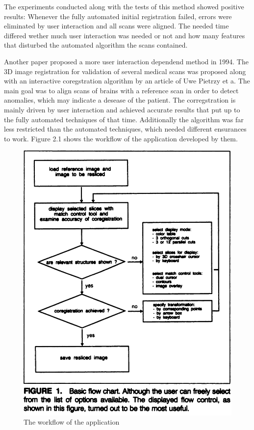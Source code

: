 \documentclass[hyperref,english,bachelorofscience,bibnum]{cgvpub}
\begin{document}
The experiments conducted along with the tests of this method showed positive results:
Whenever the fully automated initial registration failed, errors were eliminated by user interaction and all scans were aligned. The needed time differed wether much user interaction was needed or not and how many features that disturbed the automated algorithm the scans contained.

Another paper proposed a more user interaction dependend method in 1994.
The 3D image registration for validation of several medical scans was proposed along with an interactive coregstration algorithm by an article of Uwe Pietrzy et a\cite{Pietrzyk1994}. The main goal was to align scans of brains with a reference scan in order to detect anomalies, which may indicate a desease of the patient. The corregstration is mainly driven by user interaction and achieved accurate results that put up to the fully automated techniques of that time. Additionally the algorithm was far less restricted than the automated techniques, which needed different ensurances to work. Figure 2.1 shows the workflow of the application developed by them.
\begin{figure}[htbp]
	\centering
		\includegraphics[width= \linewidth]{flow_chart_uwe_p.png}
	\caption{The workflow of the application\cite{Pietrzyk1994}}
	\label{fig:workflow}
\end{figure}
\end{document}
